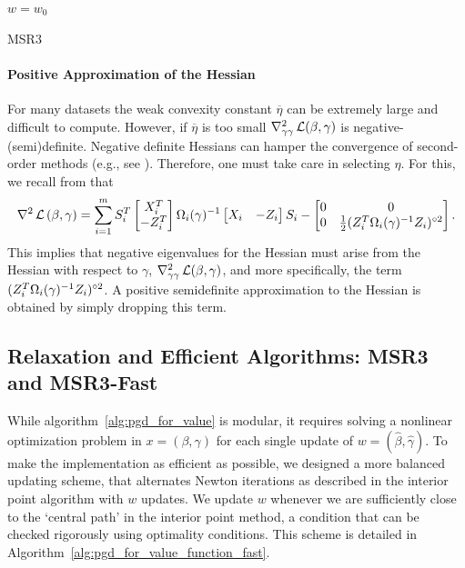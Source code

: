 \begin{algorithm}[H]
\SetAlgoLined
$w = w_0$ \\
 \caption{\label{alg:MSR3} MSR3}
\end{algorithm}



\paragraph{Positive Approximation of the Hessian}
For many datasets the weak convexity constant $\overline \eta$ can be extremely large 
and difficult to compute. However, if $\overline \eta$ is too small $\nabla^2_{\gamma\gamma}\operatorname{\mathcal{L}}(\beta, \gamma)$ is 
negative-(semi)definite. Negative definite Hessians can hamper the convergence of 
second-order methods (e.g., see \cite{nocedal2006numerical}). 
Therefore, one must take care in selecting $\eta$. For this, we recall from
\cite[Lemma 3]{Theory1} that
\begin{equation} %
\nabla^2\LL{(\beta,\gam)}=\sum_{i=1}^m
S_i^T\begin{bmatrix}X_i^T\\ -Z_i^T\end{bmatrix}
\Omega_i(\gam)^{-1}
\begin{bmatrix}X_i& -Z_i\end{bmatrix}S_i
-\begin{bmatrix}
0&0\\ 0& \half(Z_i^T\Omega_i(\gam)^{-1}Z_i)^{\circ2}
\end{bmatrix}.
\end{equation}
This implies that negative eigenvalues for the Hessian must arise from the
Hessian with respect to $\gamma$,
$\nabla^2_{\gamma\gamma}\operatorname{\mathcal{L}}(\beta, \gamma)$, and more specifically, the
term $(Z_i^T\Omega_i(\gamma)^{-1}Z_i)^{\circ2}$. 
A positive semidefinite approximation to the Hessian is obtained by simply dropping this term. 


\subsection{Relaxation and Efficient Algorithms: MSR3 and MSR3-Fast }
\label{sec:synthetic}

While algorithm~\eqref{alg:pgd_for_value} is modular, it requires solving a nonlinear optimization problem in $x = (\beta, \gamma)$ for each single update
of $w = (\hat \beta, \hat \gamma)$. To make the implementation as efficient as possible, we designed a more balanced updating scheme, that 
alternates Newton iterations as described in the interior point algorithm with $w$ updates. We update $w$ whenever we are sufficiently close 
to the `central path' in the interior point method, a condition that can be checked rigorously using optimality conditions. 
This scheme is detailed in Algorithm~\ref{alg:pgd_for_value_function_fast}.


